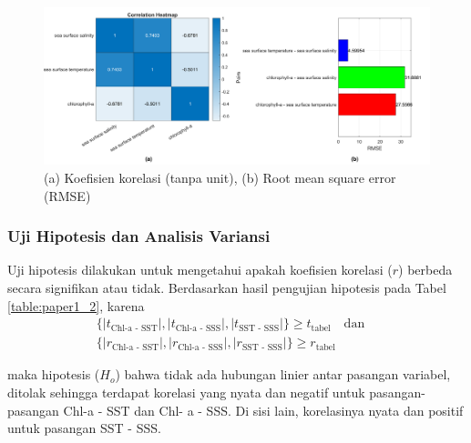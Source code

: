 \begin{spacing}{1.5}
	\begin{figure}[H]
		\centering
		\includegraphics[width=15cm]{contents/final_figure_paper1/gambar_3}
		\caption{(a) Koefisien korelasi (tanpa unit), (b) Root mean square error (RMSE)}
		\label{fig:paper1_3}
	\end{figure}

\subsubsection[Uji Hipotesis dan Analisis Variansi]{Uji Hipotesis dan Analisis Variansi}
	
	Uji hipotesis dilakukan untuk mengetahui apakah koefisien korelasi ($r$) berbeda secara signifikan atau tidak. Berdasarkan hasil pengujian hipotesis pada Tabel \ref{table:paper1_2}, karena 
	\begin{equation*}
		\begin{aligned}
			\{|t_{\text{Chl-a - SST}}|,|t_{\text{Chl-a - SSS}}|,|t_{\text{SST - SSS}}|\}\geq t_{\text{tabel}} \quad \text{dan} \quad \\
			\{|r_{\text{Chl-a - SST}}|,|r_{\text{Chl-a - SSS}}|,|r_{\text{SST - SSS}}|\}\geq r_{\text{tabel}} 	
		\end{aligned}	
	\end{equation*} 
	
	maka hipotesis ($H_o$) bahwa tidak ada hubungan linier antar pasangan variabel, ditolak sehingga terdapat korelasi yang nyata dan negatif untuk pasangan-pasangan Chl-a - SST dan Chl- a - SSS. Di sisi lain, korelasinya nyata dan positif untuk pasangan SST - SSS.
	

\end{spacing}
